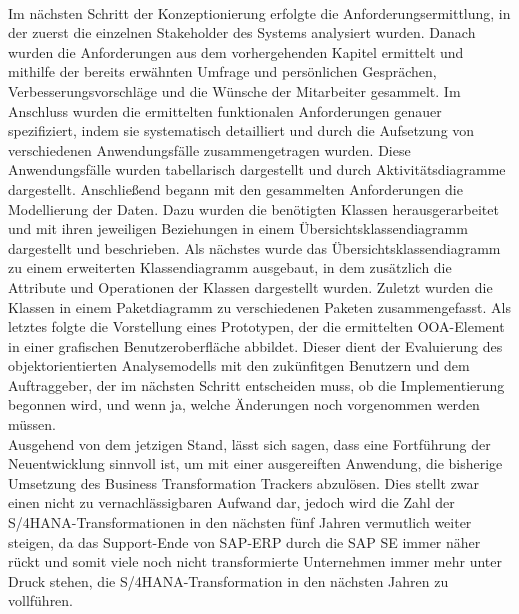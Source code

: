 \\Im nächsten Schritt der Konzeptionierung erfolgte die Anforderungsermittlung, in der zuerst die einzelnen Stakeholder des Systems analysiert wurden. Danach wurden die Anforderungen aus dem vorhergehenden Kapitel ermittelt und mithilfe der bereits erwähnten Umfrage und persönlichen Gesprächen, Verbesserungsvorschläge und die Wünsche der Mitarbeiter gesammelt. Im Anschluss wurden die ermittelten funktionalen Anforderungen genauer spezifiziert, indem sie systematisch detailliert und durch die Aufsetzung von verschiedenen Anwendungsfälle zusammengetragen wurden. Diese Anwendungsfälle wurden tabellarisch dargestellt und durch Aktivitätsdiagramme dargestellt. Anschließend begann mit den gesammelten Anforderungen die Modellierung der Daten. Dazu wurden die benötigten Klassen herausgerarbeitet und mit ihren jeweiligen Beziehungen in einem Übersichtsklassendiagramm dargestellt und beschrieben. Als nächstes wurde das Übersichtsklassendiagramm zu einem erweiterten Klassendiagramm ausgebaut, in dem zusätzlich die Attribute und Operationen der Klassen dargestellt wurden. Zuletzt wurden die Klassen in einem Paketdiagramm zu verschiedenen Paketen zusammengefasst.
Als letztes folgte die Vorstellung eines Prototypen, der die ermittelten OOA-Element in einer grafischen Benutzeroberfläche abbildet. Dieser dient der Evaluierung des objektorientierten Analysemodells mit den zukünfitgen Benutzern und dem Auftraggeber, der im nächsten Schritt entscheiden muss, ob die Implementierung begonnen wird, und wenn ja, welche Änderungen noch vorgenommen werden müssen.\\
Ausgehend von dem jetzigen Stand, lässt sich sagen, dass eine Fortführung der Neuentwicklung sinnvoll ist, um mit einer ausgereiften Anwendung, die bisherige Umsetzung des Business Transformation Trackers abzulösen. Dies stellt zwar einen nicht zu vernachlässigbaren Aufwand dar, jedoch wird die Zahl der S/4HANA-Transformationen in den nächsten fünf Jahren vermutlich weiter steigen, da das Support-Ende von SAP-ERP durch die SAP SE immer näher rückt und somit viele noch nicht transformierte Unternehmen immer mehr unter Druck stehen, die S/4HANA-Transformation in den nächsten Jahren zu vollführen.